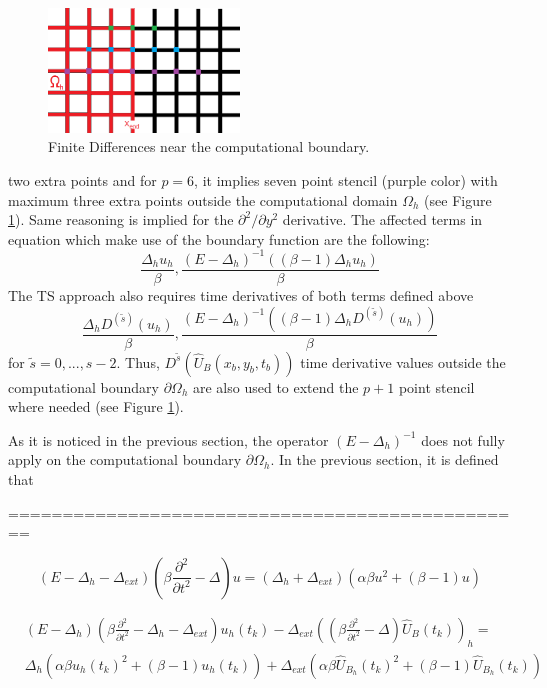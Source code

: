 \documentclass[11pt,a4paper,twoside]{article}
\begin{document}
\begin{figure}[ht]%
\begin{center}
\includegraphics[width=2in]{Pictures/BoundaryPicture.png}
	\caption{Finite Differences near the computational boundary.}
	\label{fig:BoundaryFD}
  \end{center}
\end{figure}
two extra points and for $p=6$, it implies seven point stencil (purple color) with maximum three extra points outside the computational domain $\Omega_h$ (see Figure \ref{fig:BoundaryFD}). Same reasoning is implied for the $\partial^2 / \partial y^2$ derivative. The affected terms in equation  which make use of the boundary function  are the following:
\begin{equation*}
\frac{ \Delta_h u_h}{\beta}, \frac{ (E - \Delta_h)^{-1} ( (\beta -1)\Delta_h u_h) }{\beta}
\end{equation*}
The TS approach also requires time derivatives of both terms defined above
\begin{equation*}
\frac{ \Delta_h D^{(\tilde s)} (u_h)}{\beta}, \frac{ (E - \Delta_h)^{-1} ( (\beta -1)\Delta_h D^{(\tilde s)}(u_h) ) }{\beta}
\end{equation*}
for $\tilde s = 0, ..., s-2$.  Thus, $D^{\tilde s}(\widehat U_B(x_b , y_b, t_b))$  time derivative values outside the computational boundary $\partial \Omega_h$ are also used to extend the $p+1$ point stencil where needed (see Figure  \ref{fig:BoundaryFD}). 

As it is noticed in the previous section, the operator $(E - \Delta_h)^{-1}$ does not fully apply on the computational boundary $\partial \Omega_h$. In the previous section, it is defined that

================================================

\begin{equation}
(E-\Delta_h -\Delta_{ext})(\beta \frac{ \partial^2 } { \partial t^2 } - \Delta) u =( \Delta_h + \Delta_{ext}) ( \alpha \beta u^2  + (\beta -1)u) 
\end{equation}

\begin{align}
&(E-\Delta_h)(\beta \frac{ \partial^2 } { \partial t^2 } - \Delta_h - \Delta_{ext}) u_h(t_k) - \Delta_{ext}((\beta \frac{ \partial^2 } { \partial t^2 } - \Delta)\widehat U_B(t_k))_h = 
\\
&\Delta_h ( \alpha \beta u_h(t_k)^2  + (\beta -1)u_h(t_k)) +  \Delta_{ext} ( \alpha \beta\widehat U_{B_h}(t_k)^2  + (\beta -1)\widehat U_{B_h}(t_k))  
\end{align}
\end{document}
